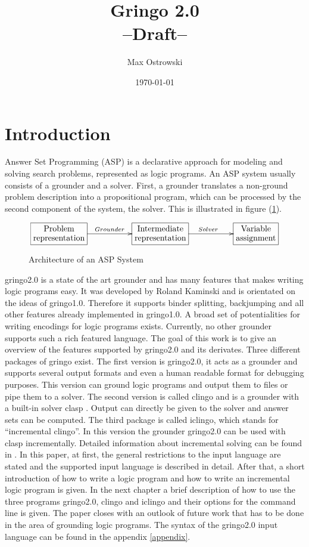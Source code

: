 \documentclass[a4paper,10pt]{article}
\author{Max Ostrowski}
\title{Gringo 2.0\\--Draft--}
\date{\today}
\begin{document}
\maketitle
\tableofcontents
\section{Introduction}
Answer Set Programming (ASP) \cite{baral02a} is a declarative approach for modeling and solving search problems, represented as logic programs.
An ASP system usually consists of a grounder and a solver.
First, a grounder translates a non-ground problem description into a propositional program, which can be processed by the second component of the system, the solver. This is illustrated in figure (\ref{fig:ASP}).
\begin{figure}[h]
\[
\xymatrix{*+[F]\txt{Problem\\representation}\ar[rr]^{Grounder}&&
		*+[F]\txt{Intermediate\\ representation} \ar[rr]^{Solver}&&
		*+[F]\txt{Variable\\ assignment}}
\]
\caption{Architecture of an ASP System}
\label{fig:ASP}
\end{figure}
gringo2.0 is a state of the art grounder and has many features that makes writing logic programs easy.
It was developed by Roland Kaminski and is orientated on the ideas of gringo1.0\cite{gringopaper}.
Therefore it supports binder splitting, backjumping and all other features already implemented in gringo1.0.
A broad set of potentialities for writing encodings for logic programs exists. Currently, no other grounder supports such a rich featured language.
The goal of this work is to give an overview of the features supported by gringo2.0 and its derivates.
Three different packages of gringo exist.
The first version is gringo2.0, it acts as a grounder and supports several output formats and even a human readable format for debugging purposes. This version can ground logic programs and output them to files or pipe them to a solver.
The second version is called clingo and is a grounder with a built-in solver clasp \cite{gekanesc07b}.
Output can directly be given to the solver and answer sets can be computed.
The third package is called iclingo, which stands for ``incremental clingo''. In this version the grounder gringo2.0 can be used with clasp incrementally. Detailed information about incremental solving can be found in \cite{gekaosscth08a}.
In this paper, at first, the general restrictions to the input language are stated and the supported input language is described in detail. After that, a short introduction of how to write a logic program and how to write an incremental logic program is given. In the next chapter a brief description of how to use the three programs gringo2.0, clingo and iclingo and their options for the command line is given. The paper closes with an outlook of future work that has to be done in the area of grounding logic programs.
The syntax of the gringo2.0 input language can be found in the appendix \ref{appendix}.
\end{document}
